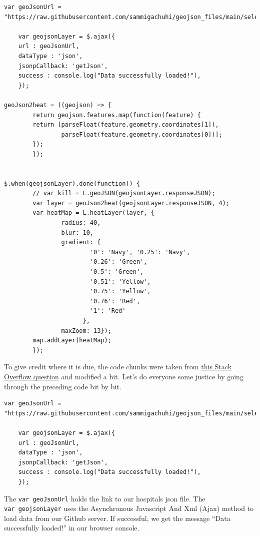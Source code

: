 \documentclass[
]{book}
\begin{document}
\begin{verbatim}
var geoJsonUrl = "https://raw.githubusercontent.com/sammigachuhi/geojson_files/main/selected_hospitals.json"

    var geojsonLayer = $.ajax({
    url : geoJsonUrl,
    dataType : 'json',
    jsonpCallback: 'getJson',
    success : console.log("Data successfully loaded!"),
    });

geoJson2heat = ((geojson) => {
        return geojson.features.map(function(feature) {
        return [parseFloat(feature.geometry.coordinates[1]), 
                parseFloat(feature.geometry.coordinates[0])];
        });
        });


$.when(geojsonLayer).done(function() {
        // var kill = L.geoJSON(geojsonLayer.responseJSON);
        var layer = geoJson2heat(geojsonLayer.responseJSON, 4);
        var heatMap = L.heatLayer(layer, { 
                radius: 40,
                blur: 10, 
                gradient: {
                        '0': 'Navy', '0.25': 'Navy',
                        '0.26': 'Green',
                        '0.5': 'Green',
                        '0.51': 'Yellow',
                        '0.75': 'Yellow',
                        '0.76': 'Red',
                        '1': 'Red'
                      },
                maxZoom: 13});
        map.addLayer(heatMap);
        });
\end{verbatim}

To give credit where it is due, the code chunks were taken from \href{https://gis.stackexchange.com/questions/337294/heatmap-with-geojson-leaflet-and-leaflet-heat-plugin?utm_source=pocket_reader}{this Stack Overflow question} and modified a bit. Let's do everyone some justice by going through the preceding code bit by bit.

\begin{verbatim}
var geoJsonUrl = "https://raw.githubusercontent.com/sammigachuhi/geojson_files/main/selected_hospitals.json"

    var geojsonLayer = $.ajax({
    url : geoJsonUrl,
    dataType : 'json',
    jsonpCallback: 'getJson',
    success : console.log("Data successfully loaded!"),
    });

\end{verbatim}

The \texttt{var\ geoJsonUrl} holds the link to our hospitals json file. The \texttt{var\ geojsonLayer} uses the Asynchronous Javascript And Xml (Ajax) method to load data from our Github server. If successful, we get the message ``Data successfully loaded!'' in our browser console.
\end{document}
